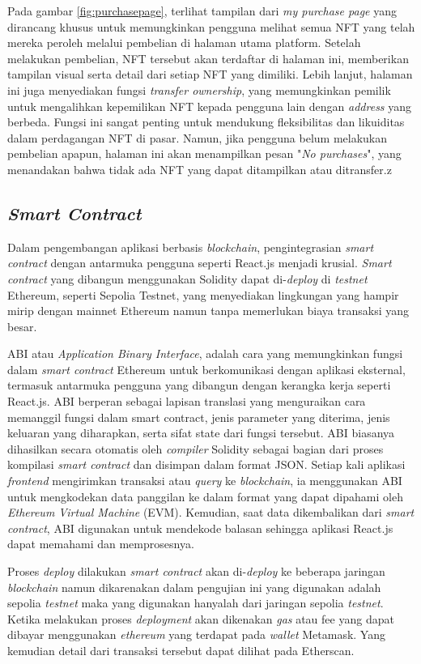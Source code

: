   Pada gambar \ref{fig:purchasepage}, terlihat tampilan dari \emph{my purchase page} yang dirancang khusus untuk memungkinkan pengguna melihat semua NFT yang telah mereka peroleh melalui pembelian di halaman utama platform. Setelah melakukan pembelian, NFT tersebut akan terdaftar di halaman ini, memberikan tampilan visual serta detail dari setiap NFT yang dimiliki. Lebih lanjut, halaman ini juga menyediakan fungsi \emph{transfer ownership}, yang memungkinkan pemilik untuk mengalihkan kepemilikan NFT kepada pengguna lain dengan \emph{address} yang berbeda. Fungsi ini sangat penting untuk mendukung fleksibilitas dan likuiditas dalam perdagangan NFT di pasar. Namun, jika pengguna belum melakukan pembelian apapun, halaman ini akan menampilkan pesan "\emph{No purchases}", yang menandakan bahwa tidak ada NFT yang dapat ditampilkan atau ditransfer.z

\subsection{\emph{Smart Contract}}
Dalam pengembangan aplikasi berbasis \emph{blockchain}, pengintegrasian \emph{smart contract} dengan antarmuka pengguna seperti React.js menjadi krusial. \emph{Smart contract} yang dibangun menggunakan Solidity dapat di-\emph{deploy} di \emph{testnet} Ethereum, seperti Sepolia Testnet, yang menyediakan lingkungan yang hampir mirip dengan mainnet Ethereum namun tanpa memerlukan biaya transaksi yang besar. 

ABI atau \emph{Application Binary Interface}, adalah cara yang memungkinkan fungsi dalam \emph{smart contract} Ethereum untuk berkomunikasi dengan aplikasi eksternal, termasuk antarmuka pengguna yang dibangun dengan kerangka kerja seperti React.js. ABI berperan sebagai lapisan translasi yang menguraikan cara memanggil fungsi dalam smart contract, jenis parameter yang diterima, jenis keluaran yang diharapkan, serta sifat state dari fungsi tersebut. ABI biasanya dihasilkan secara otomatis oleh \emph{compiler} Solidity sebagai bagian dari proses kompilasi \emph{smart contract} dan disimpan dalam format JSON. Setiap kali aplikasi \emph{frontend} mengirimkan transaksi atau \emph{query} ke \emph{blockchain}, ia menggunakan ABI untuk mengkodekan data panggilan ke dalam format yang dapat dipahami oleh \emph{Ethereum Virtual Machine} (EVM). Kemudian, saat data dikembalikan dari \emph{smart contract}, ABI digunakan untuk mendekode balasan sehingga aplikasi React.js dapat memahami dan memprosesnya.

Proses \emph{deploy} dilakukan \emph{smart contract} akan di-\emph{deploy} ke beberapa jaringan \emph{blockchain} namun dikarenakan dalam pengujian ini yang digunakan adalah sepolia \emph{testnet} maka yang digunakan hanyalah dari jaringan sepolia \emph{testnet}. Ketika melakukan proses \emph{deployment} akan dikenakan \emph{gas} atau fee yang dapat dibayar menggunakan \emph{ethereum} yang terdapat pada \emph{wallet} Metamask. Yang kemudian detail dari transaksi tersebut dapat dilihat pada Etherscan.

